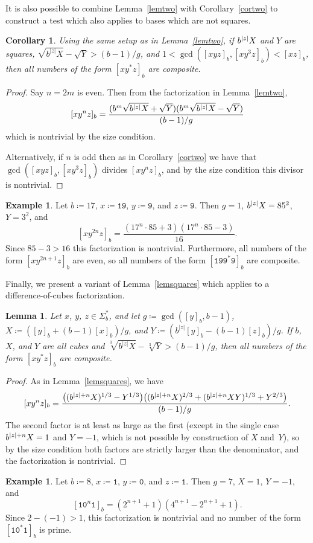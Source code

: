 \documentclass[12pt]{article}
\DeclarePairedDelimiter\abs{\lvert}{\rvert}
\theoremstyle{plain}
\newtheorem{corollary}[theorem]{Corollary}
\newtheorem{lemma}[theorem]{Lemma}
\theoremstyle{definition}
\newtheorem{example}[theorem]{Example}
\theoremstyle{remark}
\newcommand{\0}{\mathtt{0}}
\newcommand{\1}{\mathtt{1}}
\newcommand{\2}{\mathtt{2}}
\newcommand{\3}{\mathtt{3}}
\newcommand{\4}{\mathtt{4}}
\newcommand{\5}{\mathtt{5}}
\newcommand{\6}{\mathtt{6}}
\newcommand{\7}{\mathtt{7}}
\newcommand{\8}{\mathtt{8}}
\newcommand{\9}{\mathtt{9}}
\begin{document}
It is also possible to combine Lemma~\ref{lemtwo} with Corollary~\ref{cortwo} 
to construct a test which also applies to bases which are not squares.
\begin{corollary}
Using the same setup as in Lemma~\ref{lemtwo}, if\/ $b^{\abs{z}}X$ and $Y$ 
are squares, $\sqrt{b^{\lvert z\rvert}X}-\sqrt{Y}>(b-1)/g$, and
$1<\gcd([xyz]_b,[xy^3z]_b)<[xz]_b$, then all numbers of the form $[xy^*z]_b$ 
are composite.
\end{corollary}
\begin{proof}
Say $n=2m$ is even.  Then from the factorization in Lemma~\ref{lemtwo},
\[ [xy^nz]_b = \frac{(b^m\sqrt{b^{\abs{z}}X}+\sqrt{Y})(b^m\sqrt{b^{\abs{z}}X}-\sqrt{Y})}{(b-1)/g} \]
which is nontrivial by the size condition.

Alternatively, if $n$ is odd then as in Corollary~\ref{cortwo} we have that 
$\gcd([xyz]_b,[xy^3z]_b)$ divides $[xy^nz]_b$, and by the size condition this 
divisor is nontrivial.
\end{proof}
\begin{example}
Let $b\coloneqq17$, $x\coloneqq\1\9$, $y\coloneqq\9$, and $z\coloneqq\9$.  Then $g=1$, 
$b^{\abs{z}}X=85^2$, $Y=3^2$, and
\[ [xy^{2n}z]_b = \frac{(17^n\cdot85+3)(17^n\cdot85-3)}{16} . \]
Since $85-3>16$ this factorization is nontrivial.  Furthermore, all numbers 
of the form $[xy^{2n+1}z]_b$ are even, so all numbers of the form 
$[\1\9\9^*\9]_b$ are composite.
\end{example}
Finally, we present a variant of Lemma~\ref{lemsquares} which applies to a 
difference-of-cubes factorization.
\begin{lemma}\label{lemcubes}
Let $x$, $y$, $z\in\Sigma^*_b$, and let $g\coloneqq\gcd([y]_b,b-1)$, 
$X\coloneqq([y]_b+(b-1)[x]_b)/g$, and $Y\coloneqq(b^{\lvert{z}\rvert}[y]_b-(b-1)[z]_b)/g$.
If\/ $b$, $X$, and $Y$ are all cubes and 
$\sqrt[3]{b^{\lvert z\rvert}X}-\sqrt[3]{Y}>(b-1)/g$, then all numbers of 
the form
 $[xy^*z]_b$ are composite.
\end{lemma}
\begin{proof}
As in Lemma~\ref{lemsquares}, we have
\[ [xy^nz]_b = \frac{\bigl((b^{\abs{z}+n}X)^{1/3}-Y^{1/3}\bigr)\bigl((b^{\abs{z}+n}X)^{2/3}+(b^{\abs{z}+n}XY)^{1/3}+Y^{2/3}\bigr)}{(b-1)/g} . \]
The second factor is at least as large as the first (except in the 
single case $b^{\abs{z}+n}X=1$ and $Y=-1$, which is not possible by 
construction of $X$ and~$Y$),
so by the size condition both factors are strictly larger than the 
denominator, and the factorization is nontrivial.
\end{proof}
\begin{example}
Let $b\coloneqq8$, $x\coloneqq\1$, $y\coloneqq\0$, and $z\coloneqq\1$.  Then $g=7$, $X=1$, $Y=-1$, and
\[ [\1\0^n\1]_b = (2^{n+1}+1)(4^{n+1}-2^{n+1}+1) . \]
Since $2-(-1)>1$, this factorization is nontrivial and no number of the 
form $[\1\0^*\1]_b$ is prime.
\end{example}
\end{document}
